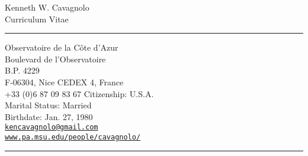 \documentclass[11pt]{cv}
\begin{document}
\begin{center}
{\Large Kenneth W. Cavagnolo\\Curriculum Vitae}
\rule{\linewidth}{1pt}
\normalsize
\end{center}
\vspace{-0.5cm}
\addresses
{
Observatoire de la C\^ote d'Azur\\
Boulevard de l'Observatoire\\
B.P. 4229\\
F-06304, Nice CEDEX 4, France\\
+33 (0)6 87 09 83 67
}
{
Citizenship: U.S.A.\\
Marital Status: Married\\
Birthdate: Jan. 27\ths, 1980\\
\href{mailto:kencavagnolo@gmail.com}{\tt{kencavagnolo@gmail.com}}\\
\href{http://www.pa.msu.edu/people/cavagnolo/}{\tt www.pa.msu.edu/people/cavagnolo/}\\
}
\vspace{-0.5cm}
\rule{\linewidth}{1pt}
\end{document}
